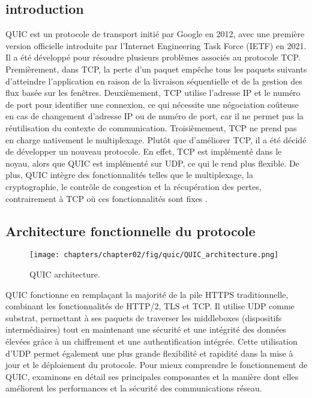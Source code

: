 \subsection{introduction}
QUIC est un protocole de transport initié par Google en 2012, avec une première version officielle introduite par l'Internet Engineering Task Force (IETF) en 2021. Il a été développé pour résoudre plusieurs problèmes associés au protocole TCP. Premièrement, dans TCP, la perte d'un paquet empêche tous les paquets suivants d'atteindre l'application en raison de la livraison séquentielle et de la gestion des flux basée sur les fenêtres. Deuxièmement, TCP utilise l'adresse IP et le numéro de port pour identifier une connexion, ce qui nécessite une négociation coûteuse en cas de changement d'adresse IP ou de numéro de port, car il ne permet pas la réutilisation du contexte de communication. Troisièmement, TCP ne prend pas en charge nativement le multiplexage. Plutôt que d'améliorer TCP, il a été décidé de développer un nouveau protocole. En effet, TCP est implémenté dans le noyau, alors que QUIC est implémenté sur UDP, ce qui le rend plus flexible. De plus, QUIC intègre des fonctionnalités telles que le multiplexage, la cryptographie, le contrôle de congestion et la récupération des pertes, contrairement à TCP où ces fonctionnalités sont fixes \cite{alawaji2021ietf, langley2017quic}. \\
\subsection{Architecture fonctionnelle du protocole}

\begin{figure}[H]
    \centering
    \texttt{[image: chapters/chapter02/fig/quic/QUIC\_architecture.png]}
    \caption{QUIC architecture.\cite{alawaji2021ietf}}
    \label{fig:gen}
\end{figure}

QUIC fonctionne en remplaçant la majorité de la pile HTTPS traditionnelle, combinant les fonctionnalités de HTTP/2, TLS et TCP. Il utilise UDP comme substrat, permettant à ses paquets de traverser les middleboxes (dispositifs intermédiaires) tout en maintenant une sécurité et une intégrité des données élevées grâce à un chiffrement et une authentification intégrée. Cette utilisation d'UDP permet également une plus grande flexibilité et rapidité dans la mise à jour et le déploiement du protocole. Pour mieux comprendre le fonctionnement de QUIC, examinons en détail ses principales composantes et la manière dont elles améliorent les performances et la sécurité des communications réseau.

